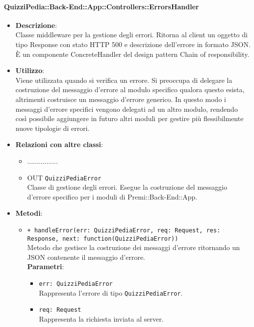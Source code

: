 \paragraph{QuizziPedia::Back-End::App::Controllers::ErrorsHandler}
\begin{itemize}
	\item \textbf{Descrizione}:\\
	Classe middleware per la gestione degli errori. Ritorna al client un oggetto di tipo Response con stato HTTP 500 e descrizione dell’errore in formato JSON. È un componente ConcreteHandler del design pattern Chain of responsibility.
	\item \textbf{Utilizzo}:\\
	Viene utilizzata quando si verifica un errore. Si preoccupa di delegare la costruzione del messaggio d’errore al modulo specifico qualora questo esista, altrimenti costruisce un messaggio d’errore generico. In questo modo i messaggi d’errore specifici vengono delegati ad un altro modulo, rendendo così possibile aggiungere in futuro altri moduli per gestire più flessibilmente nuove tipologie di errori.
	\item \textbf{Relazioni con altre classi}:\\
	\begin{itemize}
		\item ................
		\item OUT \texttt{QuizziPediaError}\\
		Classe di gestione degli errori. Esegue la costruzione del messaggio d’errore specifico per i moduli di Premi::Back-End::App.
	\end{itemize}
	\item \textbf{Metodi}:\\
	\begin{itemize}
		\item \texttt{+ handleError(err: QuizziPediaError, req: Request, res: Response, next: function(QuizziPediaError))}\\
		Metodo che gestisce la costruzione dei messaggi d’errore ritornando un JSON contenente il messaggio d’errore.\\
		\textbf{Parametri}:
		\begin{itemize}
			\item \texttt{err: QuizziPediaError}\\
			Rappresenta l'errore di tipo \texttt{QuizziPediaError}.
			\item \texttt{req: Request}\\
			Rappresenta la richiesta inviata al server.

\end{itemize}
\end{itemize}
\end{itemize}
